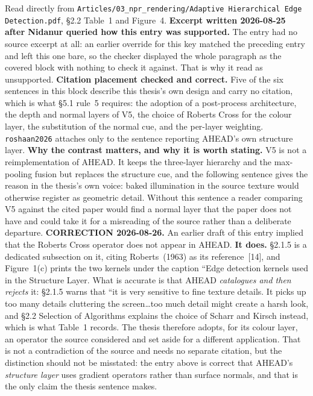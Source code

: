 \documentclass[11pt, a4paper]{article}
\begin{document}
\begin{Form}
  {Read directly from \texttt{\footnotesize Articles/03\_npr\_rendering/Adaptive Hierarchical Edge Detection.pdf}, \S2.2 Table~1 and Figure~4. \textbf{Excerpt written 2026-08-25 after Nidanur queried how this entry was supported.} The entry had no source excerpt at all: an earlier override for this key matched the preceding entry and left this one bare, so the checker displayed the whole paragraph as the covered block with nothing to check it against. That is why it read as unsupported. \textbf{Citation placement checked and correct.} Five of the six sentences in this block describe this thesis's own design and carry no citation, which is what \S5.1 rule~5 requires: the adoption of a post-process architecture, the depth and normal layers of V5, the choice of Roberts Cross for the colour layer, the substitution of the normal cue, and the per-layer weighting. \texttt{roshaan2026} attaches only to the sentence reporting AHEAD's own structure layer. \textbf{Why the contrast matters, and why it is worth stating.} V5 is not a reimplementation of AHEAD. It keeps the three-layer hierarchy and the max-pooling fusion but replaces the structure cue, and the following sentence gives the reason in the thesis's own voice: baked illumination in the source texture would otherwise register as geometric detail. Without this sentence a reader comparing V5 against the cited paper would find a normal layer that the paper does not have and could take it for a misreading of the source rather than a deliberate departure. \textbf{CORRECTION 2026-08-26.} An earlier draft of this entry implied that the Roberts Cross operator does not appear in AHEAD. \textbf{It does.} \S2.1.5 is a dedicated subsection on it, citing Roberts~(1963) as its reference~[14], and Figure~1(c) prints the two kernels under the caption ``Edge detection kernels used in the Structure Layer. What is accurate is that AHEAD \emph{catalogues and then rejects} it: \S2.1.5 warns that ``it is very sensitive to fine texture details. It picks up too many details cluttering the screen\ldots too much detail might create a harsh look, and \S2.2 Selection of Algorithms explains the choice of Scharr and Kirsch instead, which is what Table~1 records. The thesis therefore adopts, for its colour layer, an operator the source considered and set aside for a different application. That is not a contradiction of the source and needs no separate citation, but the distinction should not be misstated: the entry above is correct that AHEAD's \emph{structure layer} uses gradient operators rather than surface normals, and that is the only claim the thesis sentence makes.}


\end{Form}
\end{document}
